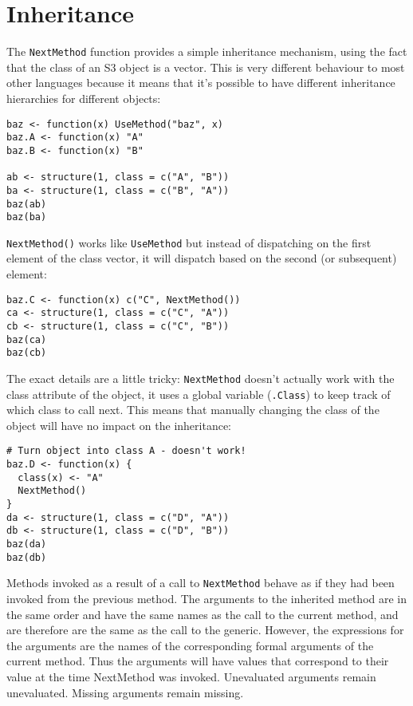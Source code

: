 \section{Inheritance}

The \texttt{NextMethod} function provides a simple inheritance
mechanism, using the fact that the class of an S3 object is a vector.
This is very different behaviour to most other languages because it
means that it's possible to have different inheritance hierarchies for
different objects:

\begin{verbatim}
baz <- function(x) UseMethod("baz", x)
baz.A <- function(x) "A"
baz.B <- function(x) "B"

ab <- structure(1, class = c("A", "B"))
ba <- structure(1, class = c("B", "A"))
baz(ab)
baz(ba)
\end{verbatim}

\texttt{NextMethod()} works like \texttt{UseMethod} but instead of
dispatching on the first element of the class vector, it will dispatch
based on the second (or subsequent) element:

\begin{verbatim}
baz.C <- function(x) c("C", NextMethod())
ca <- structure(1, class = c("C", "A"))
cb <- structure(1, class = c("C", "B"))
baz(ca)
baz(cb)
\end{verbatim}

The exact details are a little tricky: \texttt{NextMethod} doesn't
actually work with the class attribute of the object, it uses a global
variable (\texttt{.Class}) to keep track of which class to call next.
This means that manually changing the class of the object will have no
impact on the inheritance:

\begin{verbatim}
# Turn object into class A - doesn't work!
baz.D <- function(x) {
  class(x) <- "A"
  NextMethod()
}
da <- structure(1, class = c("D", "A"))
db <- structure(1, class = c("D", "B"))
baz(da)
baz(db)
\end{verbatim}

Methods invoked as a result of a call to \texttt{NextMethod} behave as
if they had been invoked from the previous method. The arguments to the
inherited method are in the same order and have the same names as the
call to the current method, and are therefore are the same as the call
to the generic. However, the expressions for the arguments are the names
of the corresponding formal arguments of the current method. Thus the
arguments will have values that correspond to their value at the time
NextMethod was invoked. Unevaluated arguments remain unevaluated.
Missing arguments remain missing.

